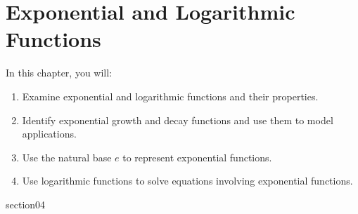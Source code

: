 \chapter{Exponential and Logarithmic Functions}

In this chapter, you will:
\begin{enumerate}
    \item Examine exponential and logarithmic functions and their properties.
    \item Identify exponential growth and decay functions and use them to model applications.
    \item Use the natural base \( e \) to represent exponential functions.
    \item Use logarithmic functions to solve equations involving exponential functions.
\end{enumerate}


{section04}
